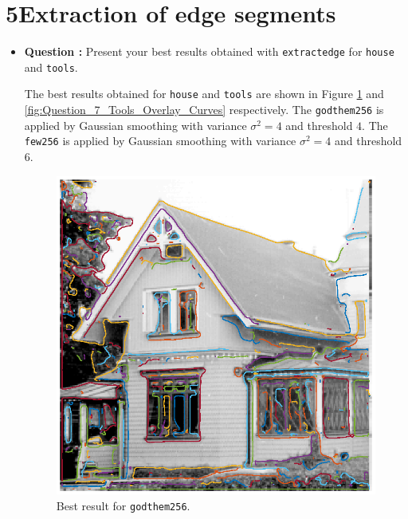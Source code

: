 \documentclass[11pt,a4paper]{article}
\begin{document}
\section*{5\hspace{0.5cm}Extraction of edge segments}
	\begin{itemize}
		\item\addtocounter{Counter}{1}\textbf{Question :} Present your best results obtained with \texttt{extractedge} for \texttt{house} and \texttt{tools}.
			\par The best results obtained for \texttt{house} and \texttt{tools} are shown in Figure \ref{fig:Question_7_House_Overlay_Curves} and \ref{fig:Question_7_Tools_Overlay_Curves} respectively. The \texttt{godthem256} is applied by Gaussian smoothing with variance $\sigma^{2}=4$ and threshold $4$. The \texttt{few256} is applied by Gaussian smoothing with variance $\sigma^{2}=4$ and threshold $6$.
			\begin{figure}[!ht]
				\centering
				\includegraphics[width=0.9\columnwidth]{Question_7_House_Overlay_Curves.eps}
				\caption{Best result for \texttt{godthem256}.}
				\label{fig:Question_7_House_Overlay_Curves}
			\end{figure}
			\begin{figure}[!ht]
				\centering

\end{figure}
\end{itemize}
\end{document}

